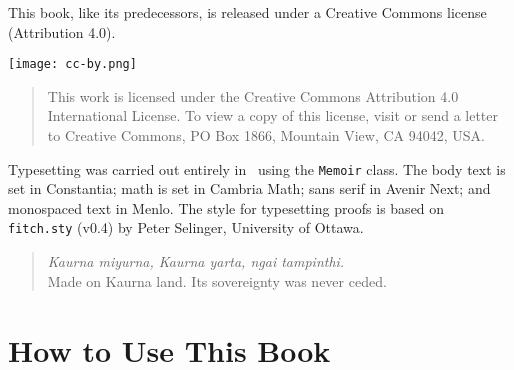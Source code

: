 This book, like its predecessors, is released under a Creative Commons license (Attribution 4.0).\medskip 

\begin{center}
	\texttt{[image: cc-by.png]} 
\end{center}

\begin{quote}
	{\small This work is licensed under the Creative Commons Attribution 4.0 International License. To view a copy of this license, visit  or send a letter to Creative Commons, PO Box 1866, Mountain View, CA 94042, USA.} 
\end{quote} \medskip


\vfill

Typesetting was carried out entirely in \XeLaTeX\ using the \texttt{Memoir} class. The body text is set in Constantia; math is set in Cambria Math; sans serif in Avenir Next; and monospaced text in Menlo. The style for typesetting proofs is based on \texttt{fitch.sty} (v0.4) by Peter Selinger, University of Ottawa.

\begin{quote}
	\emph{Kaurna miyurna, Kaurna yarta, ngai tampinthi.}\\
	Made on Kaurna land. Its sovereignty was never ceded.
\end{quote}

\newpage
\tableofcontents*\newpage
\listoffigures*

\chapter*{How to Use This Book}

